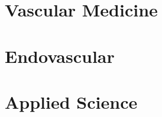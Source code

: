 \documentclass[
]{book}
\begin{document}
\hypertarget{vascular-medicine}{%
\chapter{Vascular Medicine}\label{vascular-medicine}}

\hypertarget{section-10}{%
\section{}\label{section-10}}

\hypertarget{endovascular}{%
\chapter{Endovascular}\label{endovascular}}

\hypertarget{section-11}{%
\section{}\label{section-11}}

\hypertarget{applied-science}{%
\chapter{Applied Science}\label{applied-science}}

\hypertarget{section-12}{%
\section{}\label{section-12}}

  
\end{document}
